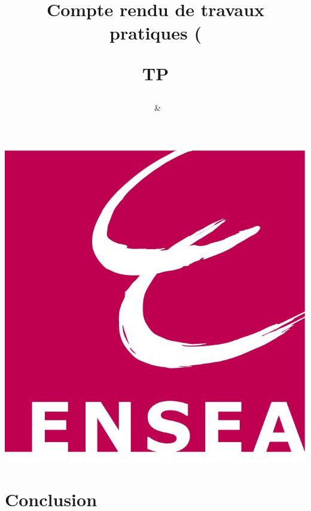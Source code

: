 \documentclass{article}[a4paper]
\title{Compte rendu de travaux pratiques (\subject)\newline TP\numTP}
\author{\binomeUn \ \& \binomeDeux}
\begin{document}
	\maketitle
	\begin{center}
		\includegraphics{"Logo ENSEA"}
	\end{center}
	\tableofcontents
	
	
	\section{}
	
	\section{Conclusion}
	
\end{document}
